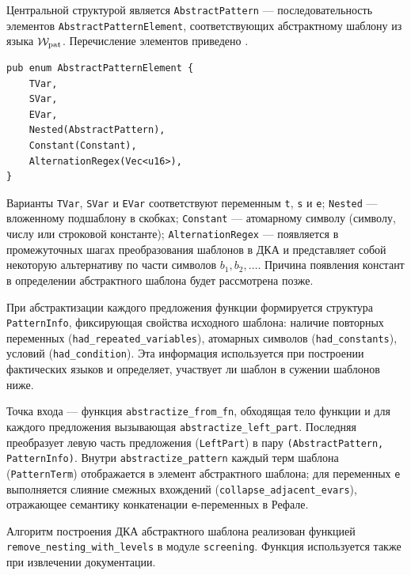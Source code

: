 Центральной структурой является \texttt{AbstractPattern} --- последовательность элементов \texttt{AbstractPatternElement}, соответствующих абстрактному шаблону из языка $\mathcal{W}_{\text{pat}}$.
Перечисление элементов приведено .

\begin{listing}[H]
\caption{Элементы абстрактного шаблона}
\label{lst:abstract-element}
\begin{verbatim}
pub enum AbstractPatternElement {
    TVar,
    SVar,
    EVar,
    Nested(AbstractPattern),
    Constant(Constant),
    AlternationRegex(Vec<u16>),
}
\end{verbatim}
\end{listing}

Варианты \texttt{TVar}, \texttt{SVar} и \texttt{EVar} соответствуют переменным \texttt{t}, \texttt{s} и \texttt{e}; \texttt{Nested} --- вложенному подшаблону в скобках; \texttt{Constant} --- атомарному символу (символу, числу или строковой константе); \texttt{AlternationRegex} --- появляется в промежуточных шагах преобразования шаблонов в ДКА и представляет собой некоторую альтернативу по части символов $b_1, b_2, \ldots$.
Причина появления констант в определении абстрактного шаблона будет рассмотрена позже.

При абстрактизации каждого предложения функции формируется структура \texttt{PatternInfo}, фиксирующая свойства исходного шаблона: наличие повторных переменных (\texttt{had\_repeated\_variables}), атомарных символов (\texttt{had\_constants}), условий (\texttt{had\_condition}).
Эта информация используется при построении фактических языков и определяет, участвует ли шаблон в сужении шаблонов ниже.

Точка входа --- функция \texttt{abstractize\_from\_fn}, обходящая тело функции и для каждого предложения вызывающая \texttt{abstractize\_left\_part}.
Последняя преобразует левую часть предложения (\texttt{LeftPart}) в пару \texttt{(AbstractPattern, PatternInfo)}.
Внутри \texttt{abstractize\_pattern} каждый терм шаблона (\texttt{PatternTerm}) отображается в элемент абстрактного шаблона; для переменных \texttt{e} выполняется слияние смежных вхождений (\texttt{collapse\_adjacent\_evars}), отражающее семантику конкатенации \texttt{e}-переменных в Рефале.

Алгоритм построения ДКА абстрактного шаблона  реализован функцией \texttt{remove\_nesting\_with\_levels} в модуле \texttt{screening}.
Функция используется также при извлечении документации.

